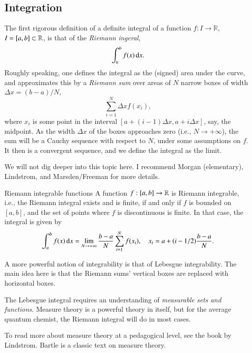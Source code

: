 \subsection{Integration}

The first rigorous definition of a definite integral of a function $f : I \to \mathbb{R}$, $I = [a,b] \subset \mathbb{R}$, is that of the \emph{Riemann ingeral},
\begin{equation}
    \int_a^b f(x) \, \mathrm{d} x.
\end{equation}
Roughly speaking, one defines the integral as the (signed) area under the curve, and approximates this by a \emph{Riemann sum} over areas of $N$ narrow boxes of width $\Delta x = (b-a)/N$,
\begin{equation}
    \sum_{i=1}^N \Delta x f(x_i), 
\end{equation}
where $x_i$ is some point in the interval $[a + (i-1)\Delta x, a + i\Delta x]$, say, the midpoint. As the width $\Delta x$ of the boxes approaches zero (i.e., $N \to +\infty$), the sum will be a Cauchy sequence with respect to $N$, under some assumptions on $f$. It then is a convergent sequence, and we define the integral as the limit.

We will not dig deeper into this topic here. I recommend Morgan (elementary), Lindstrom, and Marsden/Freeman for more details.

\begin{myTheorem}{Riemann integrable functions}{}
    A function $f : [a,b] \to \mathbb{R}$ is Riemann integrable, i.e., the Riemann integral exists and is finite, if and only if  $f$ is bounded on $[a,b]$, and the set of points where $f$ is discontinuous is finite. In that case, the integral is given by
    \[
    \int_a^b f(x) \,\mathrm{d} x = \lim_{N\to+\infty} \frac{b-a}{N} \sum_{i=1}^N f(x_i), \quad x_i = a + (i - 1/2) \frac{b-a}{N}.
    \]
\end{myTheorem}

A more powerful notion of integrability is that of Lebesgue integrability. The main idea here is that the Riemann sums' vertical boxes are replaced with horizontal boxes.

The Lebesgue integral requires an understanding of \emph{measurable sets and functions}. Measure theory is a powerful theory in itself, but for the average quantum chemist, the Riemann integral will do in most cases.

To read more about measure theory at a pedagogical level, see the book by Lindstrom. Bartle is a classic text on measure theory.


